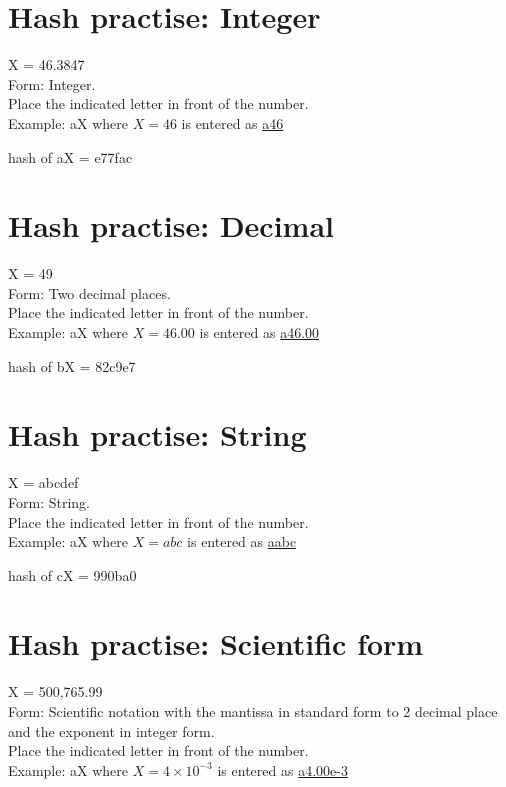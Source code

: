 \section{Hash practise: Integer}

X = 46.3847\\
Form: Integer.\\
Place the indicated letter in front of the number.\\
Example: aX where $X=46$ is entered as \href{http://www.wolframalpha.com/input/?i=md5+hash+of+\%22a46\%22}{a46}

hash of aX = e77fac

\section{Hash practise: Decimal}

X = 49\\
Form: Two decimal places.\\
Place the indicated letter in front of the number.\\
Example: aX where $X=46.00$ is entered as \href{http://www.wolframalpha.com/input/?i=md5+hash+of+\%22a46\%22}{a46.00}

hash of bX = 82c9e7

\section{Hash practise: String}

X = abcdef\\
Form: String.\\
Place the indicated letter in front of the number.\\
Example: aX where $X=abc$ is entered as \href{http://www.wolframalpha.com/input/?i=md5+hash+of+\%22aabc\%22}{aabc}

hash of cX = 990ba0

\section{Hash practise: Scientific form}

X = 500,765.99\\
Form: Scientific notation with the mantissa in standard form to 2 decimal place and the exponent in integer form.\\
Place the indicated letter in front of the number.\\
Example: aX where $X=4 \times 10^{-3}$ is entered as \href{http://www.wolframalpha.com/input/?i=md5+hash+of+\%22a4.00e-3\%22}{a4.00e-3}

